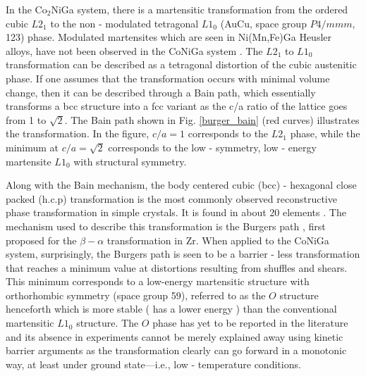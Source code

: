 \documentclass[%
preprint,
 amsmath,amssymb,
 aps,
prb,
showkeys,
]{revtex4-1}
\begin{document}
In the Co$_2$NiGa system, there is a martensitic transformation from the ordered cubic $L2_1$ to the non - modulated tetragonal $L1_0$ (AuCu, space group $P4/mmm$, 123) phase.  Modulated martensites which are seen in Ni(Mn,Fe)Ga Heusler alloys, have not been observed in the CoNiGa system \cite{Liu2006145, fichtner2015effects}. The $L2_1$ to $L1_0$ transformation can be described as a tetragonal distortion of the cubic austenitic phase. If one assumes that the transformation occurs with minimal volume change, then it can be described through a Bain path, which essentially transforms a bcc structure into a fcc variant as the c/a ratio of the lattice goes from 1 to $\sqrt{2}$. The Bain path shown in Fig. \ref{burger_bain} (red curves) illustrates the transformation. In the figure, $c/a=1$ corresponds to the $L2_1$ phase, while the minimum at $c/a = \sqrt{2}$ corresponds to the low - symmetry, low - energy martensite $L1_0$ with structural symmetry.  

Along with the Bain mechanism, the body centered cubic (bcc) - hexagonal close packed (h.c.p) transformation is the most commonly observed reconstructive phase transformation in simple crystals. It is  found in about 20 elements \cite{toledano1996reconstructive}.  The mechanism used to describe this transformation is the Burgers path \cite{burger1934}, first proposed for the $\beta - \alpha$ transformation in Zr. When applied to the CoNiGa system, surprisingly, the Burgers path is seen to be a barrier - less transformation that reaches a minimum value at distortions resulting from shuffles and shears. This minimum corresponds to a low-energy martensitic structure  with orthorhombic symmetry (space group 59), referred to as the $O$ structure henceforth which is more stable ( has a lower energy ) than the conventional martensitic $L1_0$ structure. The $O$ phase has yet to be reported in the literature and its absence in experiments cannot be merely explained away using kinetic barrier arguments as the 
transformation clearly can go forward  in a monotonic way, at least under ground state---i.e., low - temperature conditions.
\end{document}
